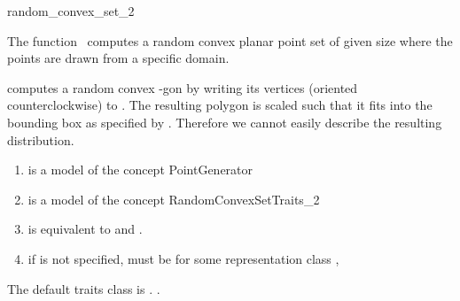 

\begin{ccRefFunction}{random_convex_set_2}

\ccDefinition

The function \ccRefName\ computes a random convex planar
point set of given size where the points are drawn from a specific
domain.


\def\ccLongParamLayout{\ccTrue} 

{
computes a random convex -gon by writing its vertices (oriented
counterclockwise) to . The resulting polygon is scaled such
that it fits into the bounding box as specified by . Therefore
we cannot easily describe the resulting distribution.
}

\begin{enumerate}
\item {} is a model of the concept PointGenerator
\item {} is a model of the concept RandomConvexSetTraits\_2 
\item {} is equivalent to 
       and .
\item if  is not specified,
   must be  for some representation class ,
\end{enumerate}


The default traits class  is 
.
.

\ccSeeAlso 
{} \\
 \\


\end{ccRefFunction}
